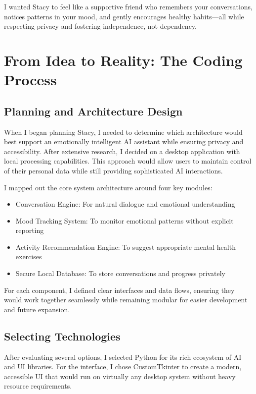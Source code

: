 \documentclass[12pt]{article}
\begin{document}
I wanted Stacy to feel like a supportive friend who remembers your conversations, notices patterns in your mood, and gently encourages healthy habits—all while respecting privacy and fostering independence, not dependency.

\section{From Idea to Reality: The Coding Process}

\subsection{Planning and Architecture Design}

When I began planning Stacy, I needed to determine which architecture would best support an emotionally intelligent AI assistant while ensuring privacy and accessibility. After extensive research, I decided on a desktop application with local processing capabilities. This approach would allow users to maintain control of their personal data while still providing sophisticated AI interactions.

I mapped out the core system architecture around four key modules:

\begin{itemize}
    \item Conversation Engine: For natural dialogue and emotional understanding
    \item Mood Tracking System: To monitor emotional patterns without explicit reporting
    \item Activity Recommendation Engine: To suggest appropriate mental health exercises
    \item Secure Local Database: To store conversations and progress privately
\end{itemize}

For each component, I defined clear interfaces and data flows, ensuring they would work together seamlessly while remaining modular for easier development and future expansion.

\subsection{Selecting Technologies}

After evaluating several options, I selected Python for its rich ecosystem of AI and UI libraries. For the interface, I chose CustomTkinter to create a modern, accessible UI that would run on virtually any desktop system without heavy resource requirements.
\end{document}

